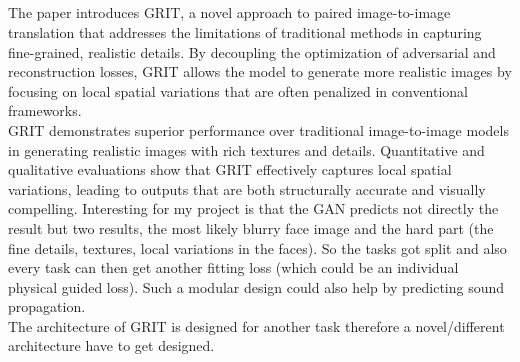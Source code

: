 		\subsection{}
			The paper introduces GRIT, a novel approach to paired image-to-image translation that addresses the limitations of traditional methods in capturing fine-grained, realistic details. By decoupling the optimization of adversarial and reconstruction losses, GRIT allows the model to generate more realistic images by focusing on local spatial variations that are often penalized in conventional frameworks.\\
			GRIT demonstrates superior performance over traditional image-to-image models in generating realistic images with rich textures and details. Quantitative and qualitative evaluations show that GRIT effectively captures local spatial variations, leading to outputs that are both structurally accurate and visually compelling.
			\clearpage
			Interesting for my project is that the GAN predicts not directly the result but two results, the most likely blurry face image and the hard part (the fine details, textures, local variations in the faces). So the tasks got split and also every task can then get another fitting loss (which could be an individual physical guided loss). Such a modular design could also help by predicting sound propagation.\\
			The architecture of GRIT is designed for another task therefore a novel/different architecture have to get designed.
			
